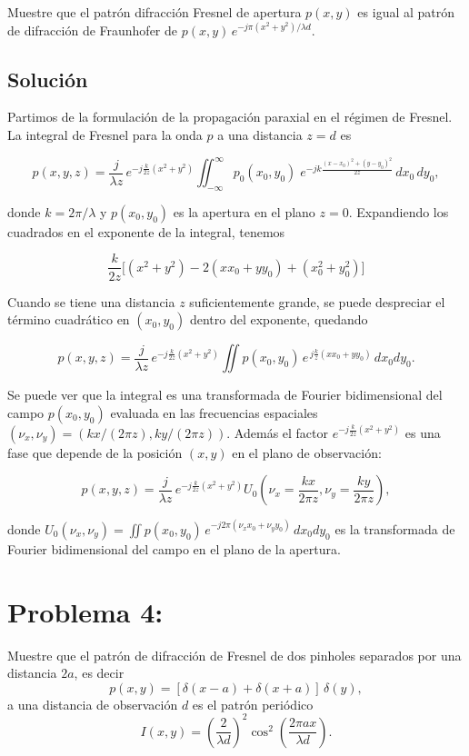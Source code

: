 \documentclass[11pt]{article}
\begin{document}
Muestre que el patrón difracción Fresnel de apertura \(p(x,y)\) es igual al patrón de difracción de Fraunhofer de \(p(x,y)\,e^{-j\pi(x^2+y^2)/\lambda d}\).

\subsection*{Solución}

Partimos de la formulación de la propagación paraxial en el régimen de Fresnel. La integral de Fresnel para la onda \(p\) a una distancia \(z=d\) es

\begin{equation}
\label{eq:fresnel}
p(x,y,z) = \frac{j}{\lambda z}\,e^{-j\frac{k}{2z}(x^2+y^2)}
\iint_{-\infty}^{\infty} p_0(x_0,y_0)\;
e^{-jk\frac{(x - x_0)^2 + (y - y_0)^2}{2z}}\,dx_0\,dy_0,
\end{equation}

donde \(k=2\pi/\lambda\) y \(p(x_0,y_0)\) es la apertura en el plano \(z=0\). Expandiendo los cuadrados en el exponente de la integral, tenemos

\[
\frac{k}{2z} \big[(x^2 + y^2) - 2(xx_0 + yy_0) + (x_0^2 + y_0^2)\big]
\]

Cuando se tiene una distancia \(z\) suficientemente grande, se puede despreciar el término cuadrático en \((x_0,y_0)\) dentro del exponente, quedando

\[
p(x,y,z) = \frac{j}{\lambda z}\,e^{-j\frac{k}{2z}(x^2+y^2)}
\iint p(x_0,y_0)\,e^{\,j\frac{k}{z}(x x_0 + y y_0)}\,dx_0dy_0.
\]

Se puede ver que la integral es una transformada de Fourier bidimensional del campo \(p(x_0,y_0)\) evaluada en las frecuencias espaciales \((\nu_x,\nu_y) = (kx/(2\pi z), ky/(2\pi z))\). Además el factor \(e^{-j\frac{k}{2z}(x^2+y^2)}\) es una fase  que depende de la posición \((x,y)\) en el plano de observación:

\[
p(x,y,z) = \frac{j}{\lambda z}\,e^{-j\frac{k}{2z}(x^2+y^2)} U_0\left(\nu_x=\frac{kx}{2\pi z}, \nu_y=\frac{ky}{2\pi z}\right),
\]

donde \(U_0(\nu_x,\nu_y) = \iint p(x_0,y_0)\,e^{-j2\pi(\nu_x x_0 + \nu_y y_0)}\,dx_0 dy_0\) es la transformada de Fourier bidimensional del campo en el plano de la apertura.

\section*{Problema 4:}

Muestre que el patrón de difracción de Fresnel de dos pinholes separados por una distancia \(2a\), es decir
\[
p(x,y) = [\delta(x-a) + \delta(x+a)]\,\delta(y),
\]
a una distancia de observación \(d\) es el patrón periódico
\[
I(x,y) = \left(\frac{2}{\lambda d}\right)^2 \cos^2\!\left(\frac{2\pi a x}{\lambda d}\right).
\]
\end{document}
